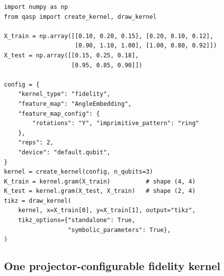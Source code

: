 \documentclass[10pt]{article}
\begin{document}
\begin{lstlisting}[caption={Constructing, evaluating, and drawing a global-fidelity kernel through the public factory.},label={lst:kernel-factory}]
import numpy as np
from qasp import create_kernel, draw_kernel

X_train = np.array([[0.10, 0.20, 0.15], [0.20, 0.10, 0.12],
                    [0.90, 1.10, 1.00], [1.00, 0.80, 0.92]])
X_test = np.array([[0.15, 0.25, 0.18],
                   [0.95, 0.85, 0.90]])

config = {
    "kernel_type": "fidelity",
    "feature_map": "AngleEmbedding",
    "feature_map_config": {
        "rotations": "Y", "imprimitive_pattern": "ring"
    },
    "reps": 2,
    "device": "default.qubit",
}
kernel = create_kernel(config, n_qubits=3)
K_train = kernel.gram(X_train)          # shape (4, 4)
K_test = kernel.gram(X_test, X_train)   # shape (2, 4)
tikz = draw_kernel(
    kernel, x=X_train[0], y=X_train[1], output="tikz",
    tikz_options={"standalone": True,
                  "symbolic_parameters": True},
)
\end{lstlisting}

\subsection{One projector-configurable fidelity kernel}
\label{sec:fidelity-kernel}
\end{document}
